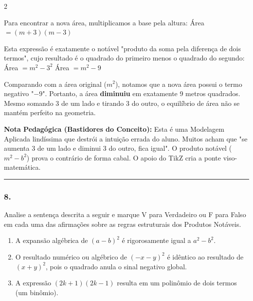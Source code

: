 \begin{multicols*}{2}
\begin{tcolorbox}[colback=CorTitUm!5, colframe=CorTitUm, boxrule=1pt, arc=4pt, left=6pt, right=6pt, top=6pt, bottom=6pt]
    Para encontrar a nova área, multiplicamos a base pela altura:
    Área $ = (m + 3)(m - 3) $
    
    Esta expressão é exatamente o notável "produto da soma pela diferença de dois termos", cujo resultado é o quadrado do primeiro menos o quadrado do segundo:
    Área $ = m^2 - 3^2 $
    Área $ = m^2 - 9 $
    
    Comparando com a área original ($m^2$), notamos que a nova área possui o termo negativo "$- 9$". 
    Portanto, a área \textbf{diminuiu} em exatamente 9 metros quadrados. Mesmo somando 3 de um lado e tirando 3 do outro, o equilíbrio de área não se mantém perfeito na geometria.
    \end{tcolorbox}
    \vspace{0.15cm}
    
    \begin{boxexplicacao}
    \textbf{Nota Pedagógica (Bastidores do Conceito):} Esta é uma Modelagem Aplicada lindíssima que destrói a intuição errada do aluno. Muitos acham que "se aumenta 3 de um lado e diminui 3 do outro, fica igual". O produto notável ($m^2 - b^2$) prova o contrário de forma cabal. O apoio do TikZ cria a ponte viso-matemática.
    \end{boxexplicacao}
\fi

\par\vspace{\espacoQuestao}

\noindent\textcolor{CorLinha}{\rule{\linewidth}{0.5pt}} 
\par\vspace{\espacoPreQuestao}
\subsubsection*{8.} 
\begin{enunciadoLiteral}
Analise a sentença descrita a seguir e marque V para Verdadeiro ou F para Falso em cada uma das afirmações sobre as regras estruturais dos Produtos Notáveis.

\begin{enumerate}[label=\Roman*., itemsep=\espacoAlt]
    \item A expansão algébrica de $ (a - b)^2 $ é rigorosamente igual a $ a^2 - b^2 $.
    \item O resultado numérico ou algébrico de $ (-x - y)^2 $ é idêntico ao resultado de $ (x + y)^2 $, pois o quadrado anula o sinal negativo global.
    \item A expressão $ (2k + 1)(2k - 1) $ resulta em um polinômio de dois termos (um binômio).
\end{enumerate}
\end{enunciadoLiteral}


\end{multicols*}
